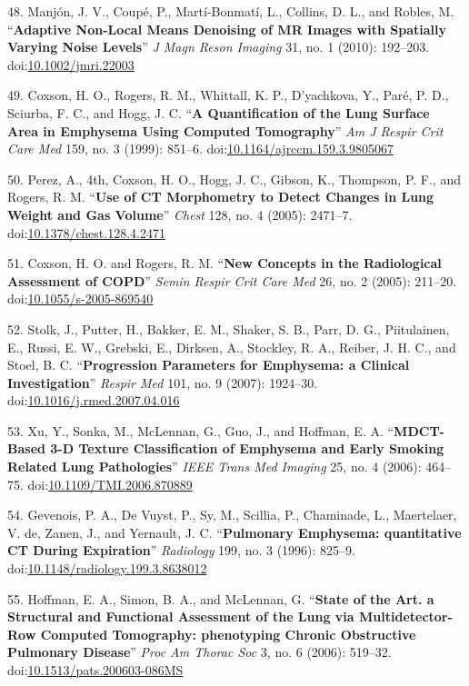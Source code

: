 \documentclass[11pt,]{article}
\begin{document}
48. Manj{ó}n, J. V., Coup{é}, P., Mart{í}-Bonmat{í}, L., Collins, D. L.,
and Robles, M. ``\textbf{Adaptive Non-Local Means Denoising of MR Images
with Spatially Varying Noise Levels}'' \emph{J Magn Reson Imaging} 31,
no. 1 (2010): 192--203.
doi:\href{http://dx.doi.org/10.1002/jmri.22003}{10.1002/jmri.22003}

49. Coxson, H. O., Rogers, R. M., Whittall, K. P., D'yachkova, Y.,
Par{é}, P. D., Sciurba, F. C., and Hogg, J. C. ``\textbf{A
Quantification of the Lung Surface Area in Emphysema Using Computed
Tomography}'' \emph{Am J Respir Crit Care Med} 159, no. 3 (1999):
851--6.
doi:\href{http://dx.doi.org/10.1164/ajrccm.159.3.9805067}{10.1164/ajrccm.159.3.9805067}

50. Perez, A., 4th, Coxson, H. O., Hogg, J. C., Gibson, K., Thompson, P.
F., and Rogers, R. M. ``\textbf{Use of CT Morphometry to Detect Changes
in Lung Weight and Gas Volume}'' \emph{Chest} 128, no. 4 (2005):
2471--7.
doi:\href{http://dx.doi.org/10.1378/chest.128.4.2471}{10.1378/chest.128.4.2471}

51. Coxson, H. O. and Rogers, R. M. ``\textbf{New Concepts in the
Radiological Assessment of COPD}'' \emph{Semin Respir Crit Care Med} 26,
no. 2 (2005): 211--20.
doi:\href{http://dx.doi.org/10.1055/s-2005-869540}{10.1055/s-2005-869540}

52. Stolk, J., Putter, H., Bakker, E. M., Shaker, S. B., Parr, D. G.,
Piitulainen, E., Russi, E. W., Grebski, E., Dirksen, A., Stockley, R.
A., Reiber, J. H. C., and Stoel, B. C. ``\textbf{Progression Parameters
for Emphysema: a Clinical Investigation}'' \emph{Respir Med} 101, no. 9
(2007): 1924--30.
doi:\href{http://dx.doi.org/10.1016/j.rmed.2007.04.016}{10.1016/j.rmed.2007.04.016}

53. Xu, Y., Sonka, M., McLennan, G., Guo, J., and Hoffman, E. A.
``\textbf{MDCT-Based 3-D Texture Classification of Emphysema and Early
Smoking Related Lung Pathologies}'' \emph{IEEE Trans Med Imaging} 25,
no. 4 (2006): 464--75.
doi:\href{http://dx.doi.org/10.1109/TMI.2006.870889}{10.1109/TMI.2006.870889}

54. Gevenois, P. A., De Vuyst, P., Sy, M., Scillia, P., Chaminade, L.,
Maertelaer, V. de, Zanen, J., and Yernault, J. C. ``\textbf{Pulmonary
Emphysema: quantitative CT During Expiration}'' \emph{Radiology} 199,
no. 3 (1996): 825--9.
doi:\href{http://dx.doi.org/10.1148/radiology.199.3.8638012}{10.1148/radiology.199.3.8638012}

55. Hoffman, E. A., Simon, B. A., and McLennan, G. ``\textbf{State of
the Art. a Structural and Functional Assessment of the Lung via
Multidetector-Row Computed Tomography: phenotyping Chronic Obstructive
Pulmonary Disease}'' \emph{Proc Am Thorac Soc} 3, no. 6 (2006): 519--32.
doi:\href{http://dx.doi.org/10.1513/pats.200603-086MS}{10.1513/pats.200603-086MS}
\end{document}
